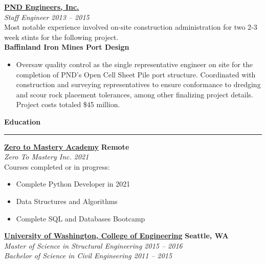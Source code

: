 \documentclass[letterpaper,6pt]{article}
\newcommand{\ts}{\textsuperscript}
\begin{document}
\vspace{3mm}
\href{https://www.pndengineers.com}{\textbf{PND Engineers, Inc.}} \\
\textit{Staff Engineer \hfill 2013 -- 2015} \\
Most notable experience involved on-site construction administration for two 2-3 week stints for the following project.\\
\textbf{\small{Baffinland Iron Mines Port Design}}
\begin{itemize}[itemsep=0.5mm,topsep=0pt]
    \item  Oversaw quality control as the single representative engineer on site for the completion of PND's Open Cell Sheet Pile\ts{\textregistered} port structure. Coordinated with construction and surveying representatives to ensure conformance to dredging and scour rock placement tolerances, among other finalizing project details. Project costs totaled \$45 million.
    \end{itemize}
    
\vspace{5mm}
{\large \textbf{Education}}
\vspace{0.5mm}
\hrule
\vspace{2mm}
\href{https://zerotomastery.io}{\textbf{Zero to Mastery Academy}} \hfill \textbf{Remote} \\
\textit{Zero To Mastery Inc. \hfill 2021} \\
Courses completed or in progress: 
\begin{itemize}[itemsep=0.5mm,topsep=0pt]
   \item Complete Python Developer in 2021
\end{itemize}
\begin{itemize}[itemsep=0.5mm,topsep=0pt]
   \item Data Structures and Algorithms
\end{itemize}
\begin{itemize}[itemsep=0.5mm,topsep=0pt]
   \item Complete SQL and Databases Bootcamp
\end{itemize}

\vspace{3mm}
\href{https://www.engr.washington.edu}{\textbf{University of Washington, College of Engineering}} \hfill \textbf{Seattle, WA} \\
\textit{Master of Science in Structural Engineering \hfill 2015 -- 2016} \\
\textit{Bachelor of Science in Civil Engineering \hfill 2011 -- 2015} %
\end{document}
